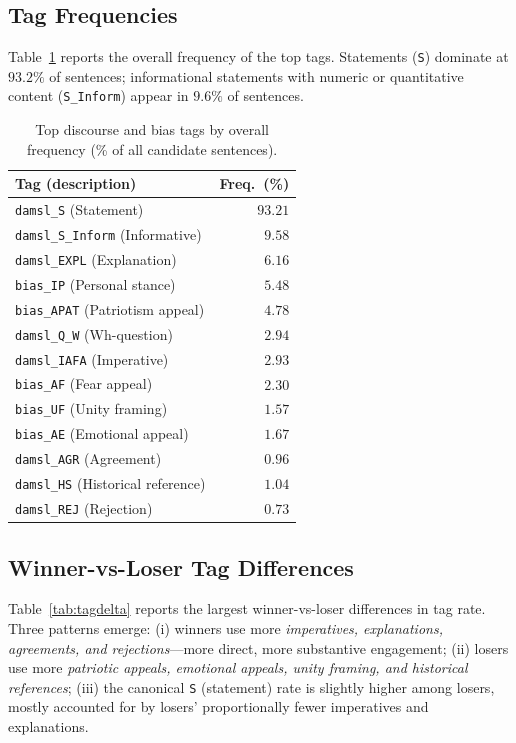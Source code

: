\documentclass[journal]{IEEEtran}
\begin{document}
\subsection{Tag Frequencies}
Table~\ref{tab:tagfreq} reports the overall frequency of the top
tags. Statements (\texttt{S}) dominate at $93.2\%$ of sentences;
informational statements with numeric or quantitative content
(\texttt{S\_Inform}) appear in $9.6\%$ of sentences.

\begin{table}[t]
\caption{Top discourse and bias tags by overall frequency
(\% of all candidate sentences).}
\label{tab:tagfreq}
\centering
\begin{tabular}{lr}
\toprule
Tag (description)                            & Freq.\ (\%) \\
\midrule
\texttt{damsl\_S} (Statement)                & $93.21$ \\
\texttt{damsl\_S\_Inform} (Informative)      & $9.58$ \\
\texttt{damsl\_EXPL} (Explanation)           & $6.16$ \\
\texttt{bias\_IP} (Personal stance)          & $5.48$ \\
\texttt{bias\_APAT} (Patriotism appeal)      & $4.78$ \\
\texttt{damsl\_Q\_W} (Wh-question)           & $2.94$ \\
\texttt{damsl\_IAFA} (Imperative)            & $2.93$ \\
\texttt{bias\_AF} (Fear appeal)              & $2.30$ \\
\texttt{bias\_UF} (Unity framing)            & $1.57$ \\
\texttt{bias\_AE} (Emotional appeal)         & $1.67$ \\
\texttt{damsl\_AGR} (Agreement)              & $0.96$ \\
\texttt{damsl\_HS} (Historical reference)    & $1.04$ \\
\texttt{damsl\_REJ} (Rejection)              & $0.73$ \\
\bottomrule
\end{tabular}
\end{table}

\subsection{Winner-vs-Loser Tag Differences}
Table~\ref{tab:tagdelta} reports the largest winner-vs-loser
differences in tag rate. Three patterns emerge: (i) winners use more
\emph{imperatives, explanations, agreements, and rejections}---more
direct, more substantive engagement; (ii) losers use more
\emph{patriotic appeals, emotional appeals, unity framing, and
historical references}; (iii) the canonical \texttt{S} (statement)
rate is slightly higher among losers, mostly accounted for by losers'
proportionally fewer imperatives and explanations.
\end{document}
